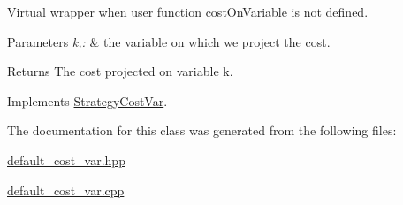 \-Virtual wrapper when user function cost\-On\-Variable is not defined. 


\begin{DoxyParams}{\-Parameters}
{\em k,\-:} & the variable on which we project the cost. \\
\hline
\end{DoxyParams}
\begin{DoxyReturn}{\-Returns}
\-The cost projected on variable k. 
\end{DoxyReturn}


\-Implements \hyperlink{classStrategyCostVar_a8381829dfa84b3460822aa0e3677a443}{\-Strategy\-Cost\-Var}.



\-The documentation for this class was generated from the following files\-:\begin{DoxyCompactItemize}
\item 
\hyperlink{default__cost__var_8hpp}{default\-\_\-cost\-\_\-var.\-hpp}\item 
\hyperlink{default__cost__var_8cpp}{default\-\_\-cost\-\_\-var.\-cpp}\end{DoxyCompactItemize}
